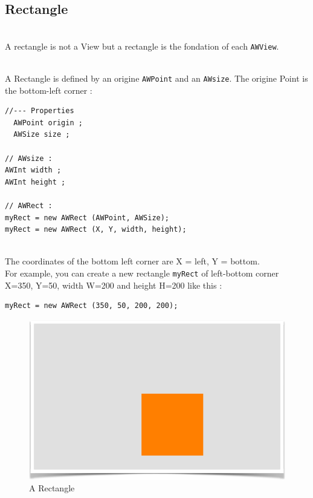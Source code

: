 \documentclass[a4paper,11pt]{extarticle}
\begin{document}
\newpage
\subsection{Rectangle}

~\\ A rectangle is not a View but a rectangle is the fondation of each \texttt{AWView}.

~\\ A Rectangle is defined by an origine \texttt{AWPoint} and an \texttt{AWsize}. The origine Point is the bottom-left corner :

\begin{lstlisting}[language=Arduinonl]
//--- Properties
  AWPoint origin ;
  AWSize size ;
  
// AWsize :
AWInt width ;
AWInt height ;

// AWRect :
myRect = new AWRect (AWPoint, AWSize);
myRect = new AWRect (X, Y, width, height);
\end{lstlisting}

~\\The coordinates of the bottom left corner are X = left, Y = bottom.
~\\ For example, you can create a new rectangle \texttt{myRect} of left-bottom corner X=350, Y=50, width W=200 and height H=200 like this :
\begin{lstlisting}[language=Arduinonl]
myRect = new AWRect (350, 50, 200, 200);
\end{lstlisting}

\begin{figure}[htbp]
   \centering
   \includegraphics[scale=0.7]{AWFig6.png} 
   \caption{A Rectangle}
   \label{fig:6 }
\end{figure}
\end{document}

